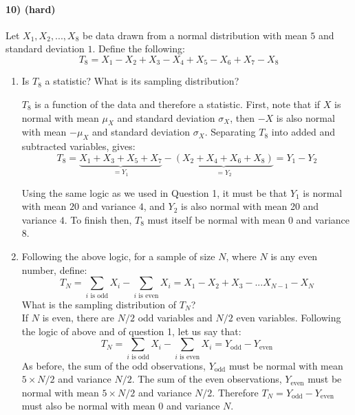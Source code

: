 \documentclass[12pt]{article}
\numberwithin{equation}{section}
\numberwithin{figure}{section}
\numberwithin{table}{section}
\begin{document}
\paragraph{10) (hard)} Let $X_1,X_2,...,X_8$ be data drawn from a normal distribution with mean $5$ and standard deviation $1$. Define the following:
\[T_8 = X_1-X_2+X_3-X_4+X_5-X_6+X_7-X_8 \]
\begin{enumerate}
\item Is $T_8$ a statistic? What is its sampling distribution? \\
{\color{blue} $T_{8}$ is a function of the data and therefore a statistic. First, note that if $X$ is normal with mean $\mu_{X}$ and standard deviation $\sigma_{X}$, then $-X$ is also normal with mean $-\mu_{X}$ and standard deviation $\sigma_{X}$.
Separating $T_{8}$ into added and subtracted variables, gives:
\[T_{8}=\underbrace{X_1+X_3+X_5+X_7}_{=Y_1}-\underbrace{(X_2+X_4+X_6+X_8)}_{=Y_2} = Y_1-Y_2\]

Using the same logic as we used in Question 1, it must be that $Y_1$ is normal with mean $20$ and variance $4$, and $Y_2$ is also normal with mean 20 and variance $4$. To finish then, $T_{8}$ must itself be normal with mean 0 and variance $8$.}

\item Following the above logic, for a sample of size $N$, where $N$ is any even number, define:
\[T_N = \sum_{i \text{ is odd}}X_i - \sum_{i\text{ is even}}X_i = X_1-X_2+X_3-...X_{N-1}-X_{N} \]
What is the sampling distribution of $T_N$? \\
{\color{blue} If $N$ is even, there are $N/2$ odd variables and $N/2$ even variables. Following the logic of above and of question 1, let us say that:
\[T_N = \sum_{i \text{ is odd}}X_i - \sum_{i\text{ is even}}X_i = Y_{\text{odd}} - Y_{\text{even}}\]
As before, the sum of the odd observations, $Y_{\text{odd}}$ must be normal with mean $5\times N/2$ and variance $N/2$. The sum of the even observations, $Y_{\text{even}}$ must be normal with mean $5\times N/2$ and variance $N/2$. Therefore $T_N=Y_{\text{odd}}-Y_{\text{even}}$ must also be normal with mean 0 and variance $N$.}
\end{enumerate}
\end{document}
